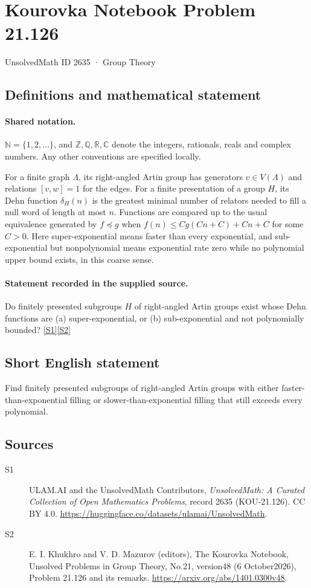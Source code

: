 \documentclass[11pt]{article}
\newcommand{\sref}[2]{\hyperlink{source:#1:#2}{[S#2]}}
\begin{document}
\setcounter{section}{2634}
\section{Kourovka Notebook Problem 21.126}\label{2635}
{\small\sffamily UnsolvedMath ID 2635 · Group Theory}
\subsection{Definitions and mathematical statement}

\paragraph{Shared notation.}$\mathbb N=\{1,2,\ldots\}$, and $\mathbb Z,\mathbb Q,\mathbb R,\mathbb C$ denote the integers, rationals, reals and complex numbers. Any other conventions are specified locally.


For a finite graph $\Lambda$, its right-angled Artin group has generators $v\in V(\Lambda)$ and relations $[v,w]=1$ for the edges. For a finite presentation of a group $H$, its Dehn function $\delta_H(n)$ is the greatest minimal number of relators needed to fill a null word of length at most $n$. Functions are compared up to the usual equivalence generated by $f\preccurlyeq g$ when $f(n)\leq Cg(Cn+C)+Cn+C$ for some $C>0$. Here super-exponential means faster than every exponential, and sub-exponential but nonpolynomial means exponential rate zero while no polynomial upper bound exists, in this coarse sense.
\paragraph{Statement recorded in the supplied source.}
Do finitely presented subgroups $H$ of right-angled Artin groups exist whose Dehn functions are (a) super-exponential, or (b) sub-exponential and not polynomially bounded? \sref{2635}{1}\sref{2635}{2}
\subsection{Short English statement}
Find finitely presented subgroups of right-angled Artin groups with either faster-than-exponential filling or slower-than-exponential filling that still exceeds every polynomial.
\subsection{Sources}
\begin{description}
\item[\hypertarget{source:2635:1}{S1}] ULAM.AI and the UnsolvedMath Contributors, \emph{UnsolvedMath: A Curated Collection of Open Mathematics Problems}, record 2635 (KOU-21.126). CC BY 4.0. \url{https://huggingface.co/datasets/ulamai/UnsolvedMath}.
\item[\hypertarget{source:2635:2}{S2}] E. I. Khukhro and V. D. Mazurov (editors), The Kourovka Notebook, Unsolved Problems in Group Theory, No.21, version48 (6 October2026), Problem 21.126 and its remarks. \url{https://arxiv.org/abs/1401.0300v48}.
\end{description}
\label{end:2635}
\end{document}
